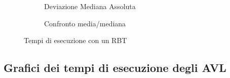 \documentclass[a4paper,titlepage]{article}
\begin{document}
\begin{figure}[h]
  \centering
  \begin{subfigure}{\textwidth}
    \captionsetup{justification=centering}
    \caption{Deviazione Mediana Assoluta}
     \label{fig:rbt_mad}
  \end{subfigure}%
   \vspace{2pt}
  \begin{subfigure}{\textwidth}
    \captionsetup{justification=centering}
     \caption{Confronto media/mediana}
     \label{fig:rbt_mean_median}
  \end{subfigure}
  \caption{Tempi di esecuzione con un RBT}
\end{figure}
\newpage

\subsection{Grafici dei tempi di esecuzione degli AVL }
\end{document}
